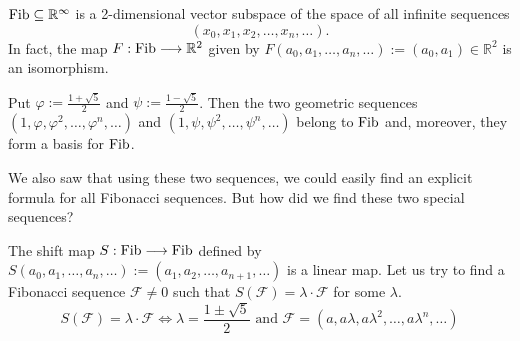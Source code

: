 \begin{claim*}\label{claim:fib_subspace}
  $\operatorname{Fib} \subseteq \mathbb{R}^{\infty}$ is a 2-dimensional vector subspace of the space of all infinite sequences \[(x_0, x_1, x_2, \dots, x_n, \dots).\]
  In fact, the map $F : \operatorname{Fib} \longrightarrow \mathbb{R}^2$ given by $F(a_0, a_1, \dots, a_n, \dots) := (a_0, a_1) \in \mathbb{R}^2$ is an isomorphism.
\end{claim*}

\begin{claim*}\label{claim:fib_basis}
  Put $\varphi := \frac{1+\sqrt{5}}{2}$ and $\psi := \frac{1-\sqrt{5}}{2}$. Then the two geometric sequences $(1, \varphi, \varphi^2, \dots, \varphi^n, \dots)$ and $(1, \psi, \psi^2, \dots, \psi^n, \dots)$ belong to $\operatorname{Fib}$ and, moreover, they form a basis for $\operatorname{Fib}$.
\end{claim*}

We also saw that using these two sequences, we could easily find an explicit formula for all Fibonacci sequences. But how did we find these two special sequences?

The shift map $S : \operatorname{Fib} \longrightarrow \operatorname{Fib}$ defined by $S(a_0, a_1, \dots, a_n, \dots) := (a_1, a_2, \dots, a_{n+1}, \dots)$ is a linear map.
Let us try to find a Fibonacci sequence $\mathcal{F} \ne 0$ such that $S(\mathcal{F}) = \lambda \cdot \mathcal{F}$ for some $\lambda$.
\[ S(\mathcal{F}) = \lambda \cdot \mathcal{F} \iff \lambda = \frac{1\pm\sqrt{5}}{2} \text{ and } \mathcal{F} = (a, a\lambda, a\lambda^2, \dots, a\lambda^n, \dots) \]


